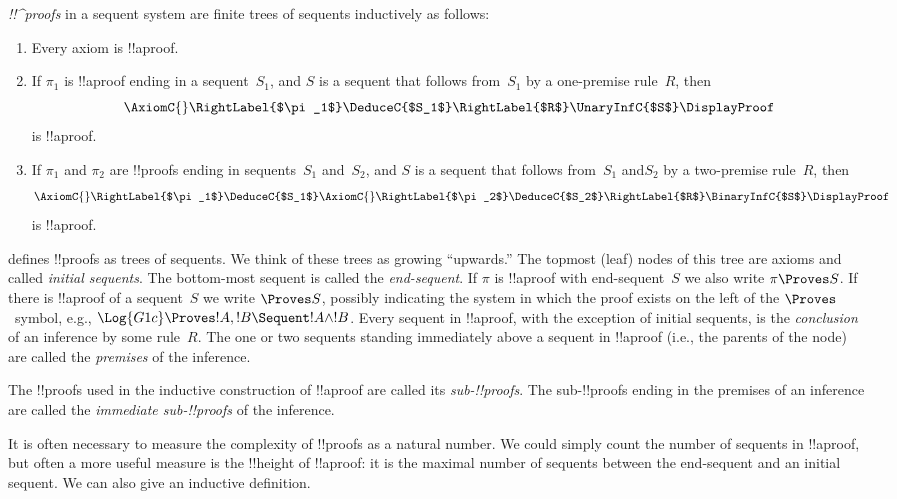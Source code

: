 \documentclass[../../../include/open-logic-section]{subfiles}
\begin{document}
\begin{defn}
\emph{!!^{proof}s} in a sequent system are finite trees of
sequents inductively as follows:
\begin{enumerate}
  \item{} Every axiom is !!a{proof}.
  \item{} If $\pi_1$ is !!a{proof} ending in
  a sequent~$S_1$, and $S$ is a sequent that follows from~$S_1$ by a
  one-premise rule~$R$, then
  \[
  \AxiomC{}
  \RightLabel{$\pi_1$}
  \DeduceC{$S_1$}
  \RightLabel{$R$}
  \UnaryInfC{$S$}
  \DisplayProof
  \]
  is !!a{proof}.
  \item{} If $\pi_1$ and $\pi_2$ are !!{proof}s ending in sequents~$S_1$ and~$S_2$, and $S$ is a
  sequent that follows from~$S_1$ and$S_2$ by a two-premise rule~$R$, then
  \[
  \AxiomC{}
  \RightLabel{$\pi_1$}
  \DeduceC{$S_1$}
  \AxiomC{}
  \RightLabel{$\pi_2$}
  \DeduceC{$S_2$}
  \RightLabel{$R$}
  \BinaryInfC{$S$}
  \DisplayProof
  \]
  is !!a{proof}.
\end{enumerate}
\end{defn}

 defines !!{proof}s as trees of sequents. We think
of these trees as growing ``upwards.'' The topmost (leaf) nodes of
this tree are axioms and called \emph{initial sequents}. The
bottom-most sequent is called the \emph{end-sequent}. If $\pi$ is
!!a{proof} with end-sequent~$S$ we also write $\pi \Proves S$. If
there is !!a{proof} of a sequent~$S$ we write $\Proves S$, possibly
indicating the system in which the proof exists on the left of the
$\Proves$~symbol, e.g., $\Log{G1c} \Proves !A, !B \Sequent !A \land
!B$. Every sequent in !!a{proof}, with the exception of initial
sequents, is the \emph{conclusion} of an inference by some rule~$R$.
The one or two sequents standing immediately above a sequent in
!!a{proof} (i.e., the parents of the node) are called the
\emph{premises} of the inference.

The !!{proof}s used in the inductive construction of
!!a{proof} are called its \emph{sub-!!{proof}s}. The
sub-!!{proof}s ending in the premises of an inference are called
the \emph{immediate sub-!!{proof}s} of the inference.

It is often necessary to measure the complexity of !!{proof}s as
a natural number. We could simply count the number of sequents in
!!a{proof}, but often a more useful measure is the !!{height} of
!!a{proof}: it is the maximal number of sequents between the
end-sequent and an initial sequent. We can also give an inductive
definition.
\end{document}
